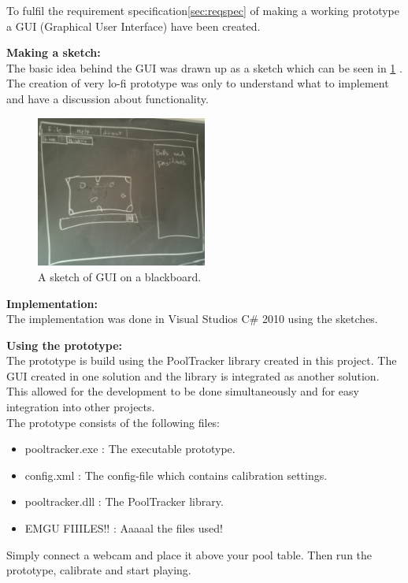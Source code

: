 To fulfil the requirement specification\ref{sec:reqspec} of making a working prototype a GUI (Graphical User Interface) have been created. 

\textbf{Making a sketch:}\\
The basic idea behind the GUI was drawn up as a sketch which can be seen in \ref{fig:guisketch} . The creation of very lo-fi prototype was only to understand what to implement and have a discussion about functionality.

\begin{figure}[H]
\begin{center}
\leavevmode
\includegraphics[width=0.5\textwidth]{images/guisketch}
\end{center}
\caption{A sketch of GUI on a blackboard.}
\label{fig:guisketch}
\end{figure} 

\textbf{Implementation:}\\
The implementation was done in Visual Studios C\# 2010 using the sketches. 


\textbf{Using the prototype:}\\
The prototype is build using the PoolTracker library created in this project. The GUI created in one solution and the library is integrated as another solution. This allowed for the development to be done simultaneously and for easy integration into other projects.\\
The prototype consists of the following files:
\begin{itemize}
	\item pooltracker.exe : The executable prototype.
	\item config.xml	  : The config-file which contains calibration settings.
	\item pooltracker.dll : The PoolTracker library.
	\item EMGU FIIILES!!  : Aaaaal the files used!
\end{itemize}

Simply connect a webcam and place it above your pool table. Then run the prototype, calibrate and start playing.